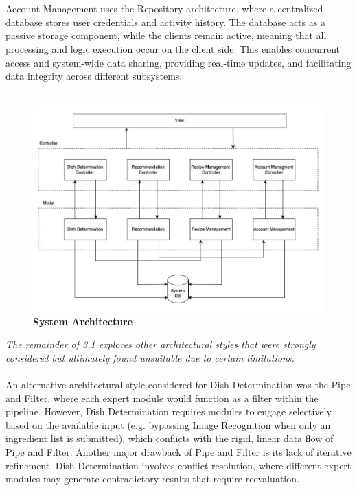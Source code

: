 \documentclass[]{article}
\begin{document}
\\
\\
Account Management uses the Repository architecture, where a centralized database stores user credentials and activity history. 
The database acts as a passive storage component, while the clients remain active, meaning that all processing and logic execution occur on the client side. 
This enables concurrent access and system-wide data sharing, providing real-time updates, and facilitating data integrity across different subsystems.
\\
\\
\begin{figure}[H]
    \centering
    \includegraphics[width=\textwidth]{image/3.1_system_arch.pdf}
    \caption{\textbf{System Architecture}}
\end{figure}
\textit{The remainder of  3.1 explores other architectural styles that were strongly considered but ultimately found unsuitable due to certain limitations.}
\\
\\
An alternative architectural style considered for Dish Determination was the Pipe and Filter, where each expert module would function as a filter within the pipeline. 
However, Dish Determination requires modules to engage selectively based on the available input (e.g. bypassing Image Recognition when only an ingredient list is submitted), which conflicts with the rigid, linear data flow of Pipe and Filter. 
Another major drawback of Pipe and Filter is its lack of iterative refinement. 
Dish Determination involves conflict resolution, where different expert modules may generate contradictory results that require reevaluation. 
\end{document}
